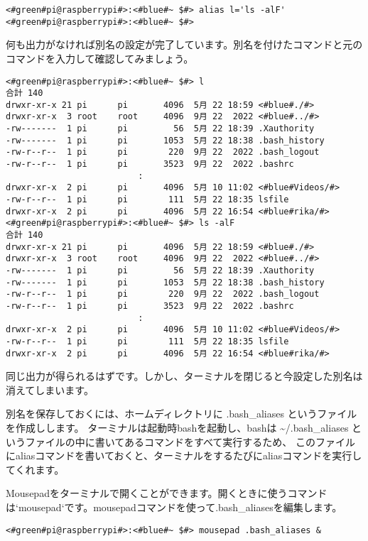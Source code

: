 \begin{lstlisting}[caption=aliasコマンドの例, label=aliasCommandExample]
<#green#pi@raspberrypi#>:<#blue#~ $#> alias l='ls -alF'
<#green#pi@raspberrypi#>:<#blue#~ $#>
\end{lstlisting}
何も出力がなければ別名の設定が完了しています。別名を付けたコマンドと元のコマンドを入力して確認してみましょう。
\begin{lstlisting}[caption=別名の確認, label=confirmAlias]
<#green#pi@raspberrypi#>:<#blue#~ $#> l
合計 140
drwxr-xr-x 21 pi      pi       4096  5月 22 18:59 <#blue#./#>
drwxr-xr-x  3 root    root     4096  9月 22  2022 <#blue#../#>
-rw-------  1 pi      pi         56  5月 22 18:39 .Xauthority
-rw-------  1 pi      pi       1053  5月 22 18:38 .bash_history
-rw-r--r--  1 pi      pi        220  9月 22  2022 .bash_logout
-rw-r--r--  1 pi      pi       3523  9月 22  2022 .bashrc
                          :
drwxr-xr-x  2 pi      pi       4096  5月 10 11:02 <#blue#Videos/#>
-rw-r--r--  1 pi      pi        111  5月 22 18:35 lsfile
drwxr-xr-x  2 pi      pi       4096  5月 22 16:54 <#blue#rika/#>
<#green#pi@raspberrypi#>:<#blue#~ $#> ls -alF
合計 140
drwxr-xr-x 21 pi      pi       4096  5月 22 18:59 <#blue#./#>
drwxr-xr-x  3 root    root     4096  9月 22  2022 <#blue#../#>
-rw-------  1 pi      pi         56  5月 22 18:39 .Xauthority
-rw-------  1 pi      pi       1053  5月 22 18:38 .bash_history
-rw-r--r--  1 pi      pi        220  9月 22  2022 .bash_logout
-rw-r--r--  1 pi      pi       3523  9月 22  2022 .bashrc
                          :
drwxr-xr-x  2 pi      pi       4096  5月 10 11:02 <#blue#Videos/#>
-rw-r--r--  1 pi      pi        111  5月 22 18:35 lsfile
drwxr-xr-x  2 pi      pi       4096  5月 22 16:54 <#blue#rika/#>
\end{lstlisting}
同じ出力が得られるはずです。しかし、ターミナルを閉じると今設定した別名は消えてしまいます。

別名を保存しておくには、ホームディレクトリに .bash{\_}aliases というファイルを作成しします。
ターミナルは起動時bashを起動し、bashは \textasciitilde/.bash{\_}aliases というファイルの中に書いてあるコマンドをすべて実行するため、
このファイルにaliasコマンドを書いておくと、ターミナルをするたびにaliasコマンドを実行してくれます。

Mousepadをターミナルで開くことができます。開くときに使うコマンドは`mousepad`です。mousepadコマンドを使って.bash{\_}aliasesを編集します。
\begin{lstlisting}[caption=\textasciitilde/.bash\_aliasesを開く, label=openingbashAliases]
<#green#pi@raspberrypi#>:<#blue#~ $#> mousepad .bash_aliases &
\end{lstlisting}

